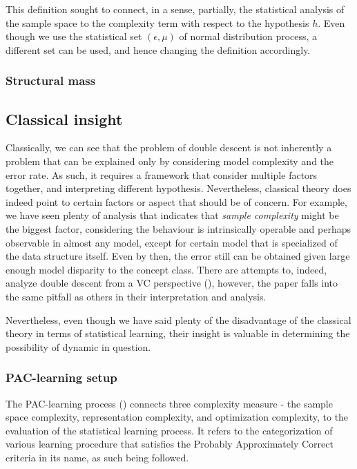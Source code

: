 \documentclass[10pt]{article} %
\begin{document}
This definition sought to connect, in a sense, partially, the statistical analysis of the sample space to the complexity term with respect to the hypothesis $h$. Even though we use the statistical set $(\epsilon,\mu)$ of normal distribution process, a different set can be used, and hence changing the definition accordingly. 

\subsubsection{Structural mass}




\subsection{Classical insight}

Classically, we can see that the problem of double descent is not inherently a problem that can be explained only by considering model complexity and the error rate. As such, it requires a framework that consider multiple factors together, and interpreting different hypothesis. Nevertheless, classical theory does indeed point to certain factors or aspect that should be of concern. For example, we have seen plenty of analysis that indicates that \textit{sample complexity} might be the biggest factor, considering the behaviour is intrinsically operable and perhaps observable in almost any model, except for certain model that is specialized of the data structure itself. Even by then, the error still can be obtained given large enough model disparity to the concept class. There are attempts to, indeed, analyze double descent from a VC perspective (\cite{lee2022vctheoreticalexplanationdouble}), however, the paper falls into the same pitfall as others in their interpretation and analysis. 

Nevertheless, even though we have said plenty of the disadvantage of the classical theory in terms of statistical learning, their insight is valuable in determining the possibility of dynamic in question. 

\subsubsection{PAC-learning setup}

The PAC-learning process (\cite{10.5555/2621980,10.5555/2371238,STL_Hajek_Maxim_2021}) connects three complexity measure - the sample space complexity, representation complexity, and optimization complexity, to the evaluation of the statistical learning process. It refers to the categorization of various learning procedure that satisfies the Probably Approximately Correct criteria in its name, as such being followed. 
\end{document}
